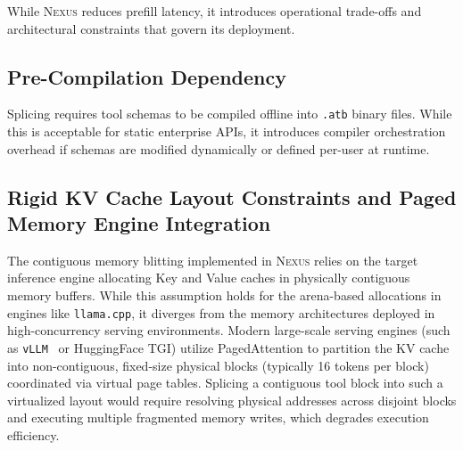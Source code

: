\documentclass[conference,10pt]{IEEEtran}
\newcommand{\Nexus}{\textsc{Nexus}\xspace}
\begin{document}
While \Nexus reduces prefill latency, it introduces operational trade-offs and architectural constraints that govern its deployment.

\subsection{Pre-Compilation Dependency}
Splicing requires tool schemas to be compiled offline into \texttt{.atb} binary files. While this is acceptable for static enterprise APIs, it introduces compiler orchestration overhead if schemas are modified dynamically or defined per-user at runtime.

\subsection{Rigid KV Cache Layout Constraints and Paged Memory Engine Integration}
The contiguous memory blitting implemented in \Nexus relies on the target inference engine allocating Key and Value caches in physically contiguous memory buffers. While this assumption holds for the arena-based allocations in engines like \texttt{llama.cpp}, it diverges from the memory architectures deployed in high-concurrency serving environments. Modern large-scale serving engines (such as \texttt{vLLM}~\cite{kwon2023vllm} or HuggingFace TGI) utilize PagedAttention to partition the KV cache into non-contiguous, fixed-size physical blocks (typically 16 tokens per block) coordinated via virtual page tables. Splicing a contiguous tool block into such a virtualized layout would require resolving physical addresses across disjoint blocks and executing multiple fragmented memory writes, which degrades execution efficiency.
\end{document}
